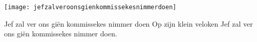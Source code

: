 \begin{intersong}
    \texttt{[image: jefzalveroonsgienkommissekesnimmerdoen]}
\end{intersong}
\beginverse*
Jef zal ver ons giën kommissekes nimmer doen 
Op zijn klein veloken 
Jef zal ver ons giën kommissekes nimmer doen. 
\endverse
\endsong